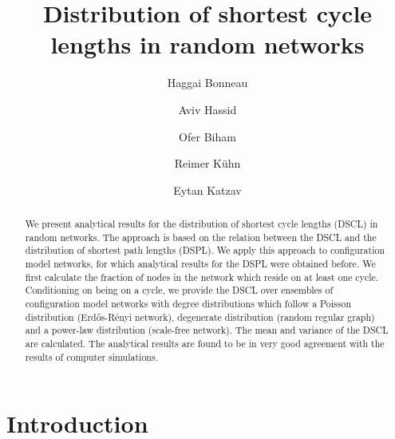 \documentclass[preprint,pre,superscriptaddress,showpacs]{revtex4}
\begin{document}
\title{Distribution of shortest cycle lengths in random networks}

\author{Haggai Bonneau}

\author{Aviv Hassid}

\author{Ofer Biham}

\author{Reimer K\"uhn}

\author{Eytan Katzav} 

\begin{abstract}
We present analytical results for the distribution of shortest 
cycle lengths (DSCL) in random networks.
The approach is based on the relation between the DSCL and 
the distribution of shortest path lengths (DSPL). 
We apply this approach to configuration model
networks, for which analytical results for the DSPL 
were obtained before.
We first calculate the fraction of nodes in the network which
reside on at least one cycle.
Conditioning on being on a cycle, we provide the
DSCL over ensembles of configuration model networks
with degree distributions
which follow a Poisson distribution
(Erd{\H o}s-R\'enyi network), degenerate distribution
(random regular graph) and a power-law distribution
(scale-free network).
The mean and variance of the DSCL
are calculated.
The analytical results are found to be in very good agreement 
with the results of computer simulations.
\end{abstract}

\maketitle

\section{Introduction}
\end{document}
